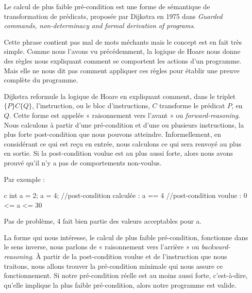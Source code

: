 \documentclass[middle]{zmdocument}
\begin{document}


Le calcul de plus faible pré-condition est une forme de sémantique de 
transformation de prédicats, proposée par Dijkstra en 1975 dans \textit{Guarded 
commands, non-determinacy and formal derivation of programs}.



Cette phrase contient pas mal de mots méchants mais le concept est en fait très
simple. Comme nous l'avons vu précédemment, la logique de Hoare nous donne des
règles nous expliquant comment se comportent les actions d'un programme. Mais 
elle ne nous dit pas comment appliquer ces règles pour établir une preuve 
complète du programme.



Dijkstra reformule la logique de Hoare en expliquant comment, dans le triplet 
$\{P\}C\{Q\}$, l'instruction, ou le bloc d'instructions, $C$ transforme le 
prédicat $P$, en $Q$. Cette forme est appelée « raisonnement vers l'avant » ou 
\textit{forward-reasoning}. Nous calculons à partir d'une pré-condition et d'une ou 
plusieurs instructions, la plus forte post-condition que nous pouvons
atteindre. Informellement, en considérant ce qui est reçu en entrée, nous 
calculons ce qui sera renvoyé au plus en sortie. Si la post-condition voulue
est au plus aussi forte, alors nous avons prouvé qu'il n'y a pas de 
comportements non-voulus.



Par exemple :



\begin{CodeBlock}{c}
int a = 2;
a = 4;
//post-condition calculée : a == 4
//post-condition voulue   : 0 <= a <= 30
\end{CodeBlock}



Pas de problème, 4 fait bien partie des valeurs acceptables pour a.



La forme qui nous intéresse, le calcul de plus faible pré-condition, fonctionne
dans le sens inverse, nous parlons de « raisonnement vers l'arrière » ou 
\textit{backward-reasoning}. À partir de la post-condition voulue et de 
l'instruction que nous traitons, nous allons trouver la pré-condition minimale
qui nous assure ce fonctionnement. Si notre pré-condition réelle est au moins
aussi forte, c'est-à-dire, qu'elle implique la plus faible pré-condition, alors
notre programme est valide.
\end{document}
